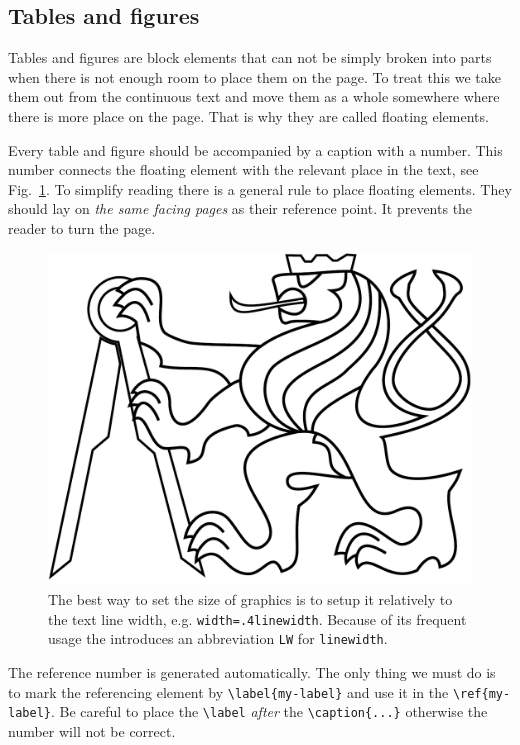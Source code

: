 \subsection{Tables and figures}
Tables and figures are block elements that can not be simply broken
into parts when there is not enough room to place them on the
page. To treat this we take them out from the continuous text and
move them as a whole somewhere where there is more place on the page. That
is why they are called floating elements.

Every table and figure should be accompanied by a caption with a
number. This number connects the floating element with the relevant
place in the text, see Fig.~\ref{fig:lev}. To simplify reading there
is a general rule to place floating elements. They should lay on
\emph{the same facing pages} as their reference point. It prevents
the reader to turn the page.
\begin{figure}
  \centering
  \includegraphics[width=.4\LW]{lev}
  \caption{The best way to set the size of graphics is to setup it relatively
    to the text line width,
    e.g. {\tt width=.4\Backslash linewidth}. Because of its frequent usage
    the \FelThesis{} introduces an abbreviation
    {\tt\Backslash LW} for {\tt\Backslash linewidth}.}
  \label{fig:lev}
\end{figure}

The reference number is generated automatically. The only thing we
must do is to mark the referencing element by \verb+\label{my-label}+ and
use it in the \verb+\ref{my-label}+. Be careful to place the \verb+\label+
\emph{after} the \verb+\caption{...}+ otherwise the number will not be correct.

